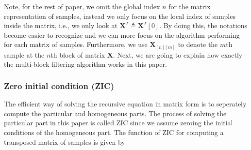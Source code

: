 Note, for the rest of paper, we omit the global index $n$ for the matrix representation of samples,
instead we only focus on the local index of samples inside the matrix, i.e.,
we only look at $\bm{X}^T {\triangleq} \bm{X}^T[0]$.
By doing this, the notations become easier to recognize and 
we can more focus on the algorithm performing for each matrix of samples.
Furthermore, 
we use $\bm{X}_{[n][m]}$ to denote the $m$th sample at the $n$th block
of matrix $\bm{X}$. Next, we are going to explain how exactly the multi-block filtering algorithm works in this paper. 

\subsubsection{Zero initial condition (ZIC)}

The efficient way of solving the recursive equation in matrix form is to seperately compute
the particular and homogeneous parts. The process of solving the particular part in this paper is called
ZIC since we assume zeroing the initial conditions of the homogeneous part. 
The function of ZIC for computing a transposed matrix of samples is given by

